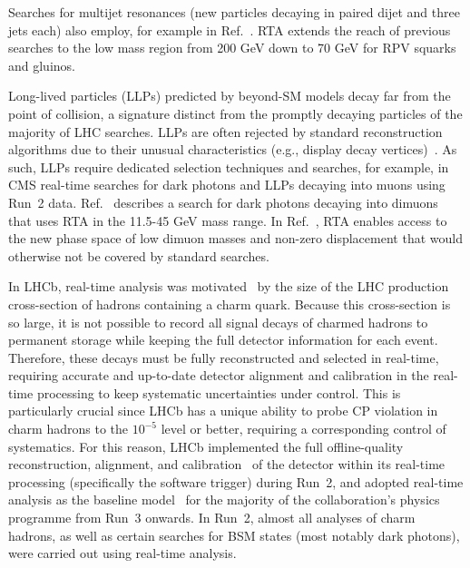 
Searches for multijet resonances (new particles decaying in paired dijet and three jets each) also employ, for example in Ref.~\cite{CMS:scouting-search-multijet}. RTA extends the reach of previous searches to the low mass region from 200 GeV down to 70 GeV for RPV squarks and gluinos. 

Long-lived particles (LLPs) predicted by beyond-SM models decay far from the point of collision, a signature distinct from the promptly decaying particles of the majority of LHC searches. LLPs are often rejected by standard reconstruction algorithms due to their unusual characteristics (e.g., display decay vertices)~\cite{llps}. As such, LLPs require dedicated selection techniques and searches, for example, in CMS real-time searches for dark photons and LLPs decaying into muons using Run~2 data.  Ref.~\cite{CMS:2019buh} describes a search for dark photons decaying into dimuons that uses RTA in the 11.5-45 GeV mass range. In Ref.~\cite{CMS:2021sch}, RTA enables access to the new phase space of low dimuon masses and non-zero displacement that would otherwise not be covered by standard searches.



In LHCb, real-time analysis was motivated~\cite{Gligorov:2018fuk} by the size of the LHC production cross-section of hadrons containing a charm 
quark. Because this cross-section is so large, it is not possible to record all signal decays of charmed hadrons to permanent storage while keeping the full detector information for each event. Therefore, these decays must be fully reconstructed and selected in real-time, requiring accurate and up-to-date detector alignment and calibration in the real-time processing to keep systematic uncertainties under control. This is particularly crucial since LHCb has a unique ability to probe CP violation in charm hadrons to the $10^{-5}$ level or better, requiring a corresponding control of systematics. For this reason, LHCb implemented the full offline-quality reconstruction, alignment, and calibration~\cite{Dujany:2015lxd, Aaij:2016rxn, Borghi:2017hfp, LHCb:2018zdd, Aaij:2019uij} of the detector within its real-time processing (specifically the software trigger) during Run~2, and adopted real-time analysis as the baseline model~\cite{LHCbCollaboration:2319756} for the majority of the collaboration's physics programme from Run~3 onwards. In Run~2, almost all analyses of charm hadrons, as well as certain searches for BSM states (most notably dark photons), were carried out using real-time analysis.